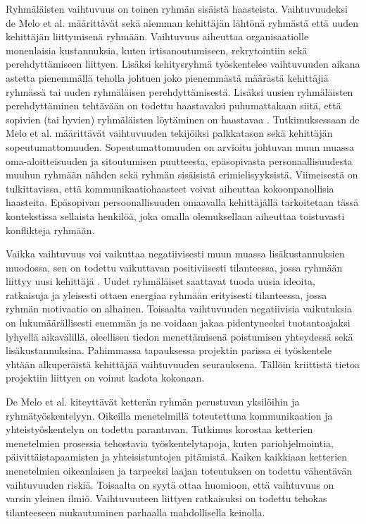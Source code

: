 Ryhmäläisten vaihtuvuus on toinen ryhmän sisäistä haasteista. Vaihtuvuudeksi de Melo et al. \cite{DEOMELO2013412} määrittävät sekä aiemman kehittäjän lähtönä ryhmästä että uuden kehittäjän liittymisenä ryhmään. Vaihtuvuus aiheuttaa organisaatiolle monenlaisia kustannuksia, kuten irtisanoutumiseen, rekrytointiin sekä perehdyttämiseen liittyen. Lisäksi kehitysryhmä työskentelee vaihtuvuuden aikana astetta pienemmällä teholla johtuen joko pienemmästä määrästä kehittäjiä ryhmässä tai uuden ryhmäläisen perehdyttämisestä. Lisäksi uusien ryhmäläisten perehdyttäminen tehtävään on todettu haastavaksi \cite{SELLERISILVA201520} puhumattakaan siitä, että sopivien (tai hyvien) ryhmäläisten löytäminen on haastavaa \cite{GREGORY201692}. Tutkimuksessaan de Melo et al. \cite{DEOMELO2013412} määrittävät vaihtuvuuden tekijöiksi palkkatason sekä kehittäjän sopeutumattomuuden. Sopeutumattomuuden on arvioitu johtuvan muun muassa oma-aloitteisuuden ja sitoutumisen puutteesta, epäsopivasta personaallisuudesta muuhun ryhmään nähden sekä ryhmän sisäisistä erimielisyyksistä. Viimeisestä on tulkittavissa, että kommunikaatiohaasteet voivat aiheuttaa kokoonpanollisia haasteita. Epäsopivan persoonallisuuden omaavalla kehittäjällä tarkoitetaan tässä kontekstissa sellaista henkilöä, joka omalla olemuksellaan aiheuttaa toistuvasti konflikteja ryhmään.

Vaikka vaihtuvuus voi vaikuttaa negatiivisesti muun muassa lisäkustannuksien muodossa, sen on todettu vaikuttavan positiviisesti tilanteessa, jossa ryhmään liittyy uusi kehittäjä \cite{DEOMELO2013412}. Uudet ryhmäläiset saattavat tuoda uusia ideoita, ratkaisuja ja yleisesti ottaen energiaa ryhmään erityisesti tilanteessa, jossa ryhmän motivaatio on alhainen. Toisaalta vaihtuvuuden negatiivisia vaikutuksia on lukumäärällisesti enemmän ja ne voidaan jakaa pidentyneeksi tuotantoajaksi lyhyellä aikavälillä, oleellisen tiedon menettämisenä poistumisen yhteydessä sekä lisäkustannuksina. Pahimmassa tapauksessa projektin parissa ei työskentele yhtään alkuperäistä kehittäjää vaihtuvuuden seurauksena. Tällöin kriittistä tietoa projektiin liittyen on voinut kadota kokonaan.

De Melo et al. \cite{DEOMELO2013412} kiteyttävät ketterän ryhmän perustuvan yksilöihin ja ryhmätyöskentelyyn. Oikeilla menetelmillä toteutettuna kommunikaation ja yhteistyöskentelyn on todettu parantuvan. Tutkimus korostaa ketterien menetelmien prosessia tehostavia työskentelytapoja, kuten pariohjelmointia, päivittäistapaamisten ja yhteisistuntojen pitämistä. Kaiken kaikkiaan ketterien menetelmien oikeanlaisen ja tarpeeksi laajan toteutuksen on todettu vähentävän vaihtuvuuden riskiä. Toisaalta on syytä ottaa huomioon, että vaihtuvuus on varsin yleinen ilmiö. Vaihtuvuuteen liittyen ratkaisuksi on todettu tehokas tilanteeseen mukautuminen parhaalla mahdollisella keinolla.
